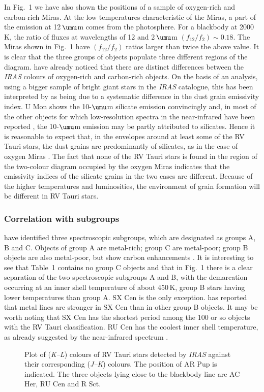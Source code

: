 \documentclass[useAMS,usedcolumn,usegraphicx,usenatbib]{mn2e}
\begin{document}
In Fig.~1 we have also shown the positions of a sample of
oxygen-rich and carbon-rich Miras. At the low temperatures
characteristic of the Miras, a part of the emission at 12$\,\umu$m
comes from the photosphere. For a blackbody at 2000$\,$K, the
ratio of fluxes at wavelengths of 12 and 2$\,\umu$m
$(f_{12}/f_{2})\sim 0.18$. The Miras shown in Fig.~1 have
$(f_{12}/f_{2})$ ratios larger than twice the above value. It is
clear that the three groups of objects populate three different
regions of the diagram. \citet{b10} have already noticed that
there are distinct differences between the {\it IRAS\/} colours of
oxygen-rich and carbon-rich objects. On the basis of an analysis,
using a bigger sample of bright giant stars in the {\it IRAS\/}
catalogue, this has been interpreted by \citet{b25} as being due
to a systematic difference in the dust grain emissivity index. U
Mon shows the 10-$\umu$m silicate emission convincingly and, in
most of the other objects for which low-resolution spectra in the
near-infrared have been reported \citep{b5,b19}, the 10-$\umu$m
emission may be partly attributed to silicates. Hence it is
reasonable to expect that, in the envelopes around at least some
of the RV Tauri stars, the dust grains are predominantly of
silicates, as in the case of oxygen Miras \citep{b21}. The fact
that none of the RV Tauri stars is found in the region of the
two-colour diagram occupied by the oxygen Miras indicates that the
emissivity indices of the silicate grains in the two cases are
different. Because of the higher temperatures and luminosities,
the environment of grain formation will be different in RV Tauri
stars.

\subsubsection{Correlation with subgroups}

\citet{b20} have identified three spectroscopic subgroups, which
are designated as groups A, B and C. Objects of group A are
metal-rich; group C are metal-poor; group B objects are also
metal-poor, but  show carbon enhancements \citep{b20,b14,b4,b1}.
It is interesting to see that Table~1 contains no group C objects
and that in Fig.~1 there is a clear separation of the two
spectroscopic subgroups A and B, with the demarcation  occurring
at an inner shell temperature of about 450$\,$K, group B stars
having lower temperatures than group A. SX Cen is the only
exception. \citet{b14} has reported that metal lines are stronger
in SX Cen than in other group B objects. It may be worth noting
that SX Cen has the shortest period among the 100 or so objects
with the RV Tauri classification. RU Cen has the coolest inner
shell temperature, as already suggested by the near-infrared
spectrum \citep{b6}.
\begin{figure}
  \vspace*{174pt}
  \caption{Plot of ({\it K--L\/}) colours of RV Tauri stars detected by
  {\it IRAS\/} against their corresponding ({\it J--K\/}) colours. The
  position of AR Pup is indicated. The three objects lying close to the
  blackbody line are AC Her, RU Cen and R Sct.}
\end{figure}
\end{document}
